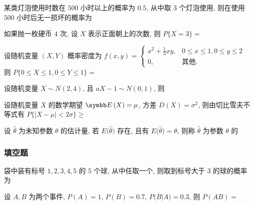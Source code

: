 \begin{ti}
	某类灯泡使用时数在 $500$ 小时以上的概率为 $0.5$, 从中取 $3$ 个灯泡使用, 则在使用 $500$ 小时后无一损坏的概率为 \kuo
\end{ti}

\begin{ti}
	如果抛一枚硬币 $4$ 次, 设 $X$ 表示正面朝上的次数, 则 $P\{ X = 3 \} = $ \kuo
\end{ti}

\begin{ti}
	设随机变量 $(X,Y)$ 概率密度为 $f(x,y) = \begin{cases}
		x^{2} + \frac{1}{3} xy, & 0 \leqslant x \leqslant 1, 0 \leqslant y \leqslant 2\\
		0, & \text{其他}.
	\end{cases}$ 则 $P\{ 0 \leqslant X \leqslant 1, 0 \leqslant Y \leqslant 1 \} = $ \kuo
\end{ti}

\begin{ti}
	设随机变量 $X \sim N(2,4)$, 且 $aX - 1 \sim N(0,1)$, 则 \kuo
\end{ti}

\begin{ti}
	设随机变量 $X$ 的数学期望 $\EE(X) = \mu$, 方差 $D(X) = \sigma^{2}$, 则由切比雪夫不等式有 $P\{ |X - \mu| < 2 \sigma \} \geqslant $ \kuo
\end{ti}

\begin{ti}
	设 $\hat{\theta}$ 为未知参数 $\theta$ 的估计量, 若 $E \bigl( \hat{\theta} \bigr)$ 存在, 且有 $E \bigl( \hat{\theta} \bigr) = \theta$, 则称 $\hat{\theta}$ 为参数 $\theta$ 的 \kuo
\end{ti}

\subsubsection{填空题}
\begin{ti}
	袋中装有标号 $1,2,3,4,5$ 的 $5$ 个球, 从中任取一个, 则取到标号大于 $3$ 的球的概率为 \hua
\end{ti}

\begin{ti}
	设 $A,B$ 为两个事件, $P(A) = 1$, $P(B) = 0.7$, $P\bigl( \overline{B}\bigl|A \bigr) = 0.3$, 则 $P(AB) = $ \hua
\end{ti}

